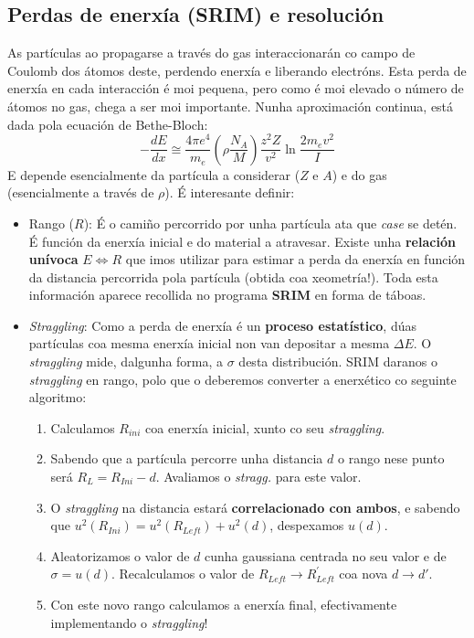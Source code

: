 \documentclass[11pt, a4paper]{article}
\begin{document}
\subsection{Perdas de enerxía (SRIM) e resolución}
As partículas ao propagarse a través do gas interaccionarán co campo de Coulomb dos átomos deste, perdendo enerxía e liberando electróns. Esta perda de enerxía en cada interacción é moi pequena, pero como é moi elevado o número de átomos no gas, chega a ser moi importante. Nunha aproximación continua, está dada pola ecuación de Bethe-Bloch:
\begin{equation*}\label{eq:stopping}
    - \frac{dE}{dx} \cong \frac{4 \pi e^4}{m_e} \left(\rho \frac{N_A}{M}\right)\frac{z^2 Z}{v^2} \ln{\frac{2m_e v^2}{I}}
\end{equation*}
E depende esencialmente da partícula a considerar ($Z$ e $A$) e do gas (esencialmente a través de $\rho$). É interesante definir:
\begin{itemize}
    \item Rango ($R$): É o camiño percorrido por unha partícula ata que \textit{case} se detén. É función da enerxía inicial e do material a atravesar. Existe unha \textbf{relación unívoca} $E \Longleftrightarrow R$ que imos utilizar para estimar a perda da enerxía en función da distancia percorrida pola partícula (obtida coa xeometría!). Toda esta información aparece recollida no programa \textbf{SRIM} en forma de táboas.
    \item \textit{Straggling}: Como a perda de enerxía é un \textbf{proceso estatístico}, dúas partículas coa mesma enerxía inicial non van depositar a mesma $\Delta E$. O \textit{straggling} mide, dalgunha forma, a $\sigma$ desta distribución. SRIM daranos o \textit{straggling} en rango, polo que o deberemos converter a enerxético co seguinte algoritmo:
          \begin{enumerate}
              \item Calculamos $R_{ini}$ coa enerxía inicial, xunto co seu \textit{straggling}.
              \item Sabendo que a partícula percorre unha distancia $d$ o rango nese punto será $R_{L} = R_{Ini} - d$. Avaliamos o \textit{stragg.} para este valor.
              \item O \textit{straggling} na distancia estará \textbf{correlacionado con ambos}, e sabendo que $u^2(R_{Ini}) = u^2(R_{Left}) + u^2(d)$, despexamos $u(d)$.
              \item Aleatorizamos o valor de $d$ cunha gaussiana centrada no seu valor e de $\sigma = u(d)$. Recalculamos o valor de $R_{Left} \longrightarrow R_{Left}^{\prime}$ coa nova $d \longrightarrow d\prime$.
              \item Con este novo rango calculamos a enerxía final, efectivamente implementando o \textit{straggling}!
          \end{enumerate}
\end{itemize}
\end{document}
